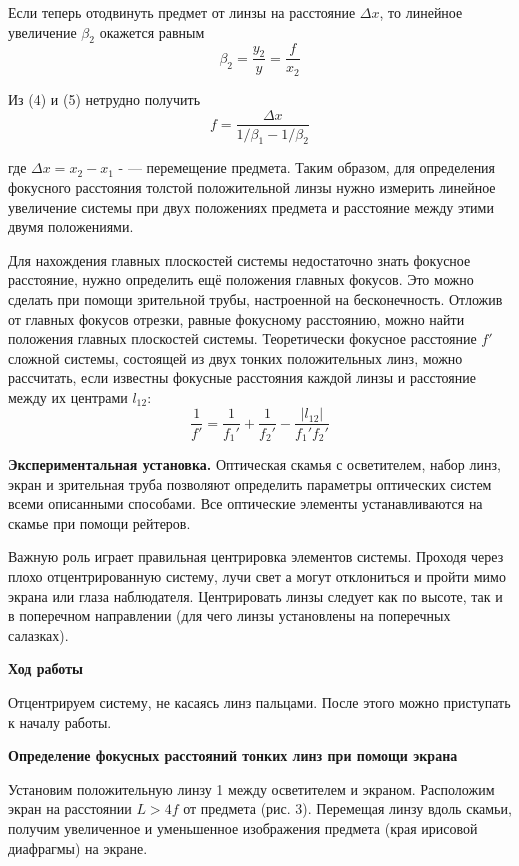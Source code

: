 \documentclass[14pt]{article}
\begin{document}
Если теперь отодвинуть предмет от линзы на расстояние $\Delta x$, то линейное
увеличение $\beta_2$ окажется равным
\begin{equation}
\beta_2 = \frac{y_2}{y} = \frac{f}{x_2}
\end{equation}

Из (4) и (5) нетрудно получить
\begin{equation}
f = \frac{\Delta x}{1/\beta_1 - 1/\beta_2}
\end{equation}

где $\Delta x = x_2 - x_1$ - — перемещение предмета.
Таким образом, для определения фокусного расстояния толстой положительной линзы нужно измерить
линейное увеличение системы при двух положениях предмета и
расстояние между этими двумя положениями.


Для нахождения главных плоскостей системы недостаточно знать
фокусное расстояние, нужно определить ещё положения главных фокусов.
Это можно сделать при помощи зрительной трубы, настроенной на бесконечность. Отложив от главных фокусов отрезки, равные фокусному
расстоянию, можно найти положения главных плоскостей системы.
Теоретически фокусное расстояние
$f'$ сложной системы, состоящей из
двух тонких положительных линз, можно рассчитать, если известны
фокусные расстояния
каждой линзы и расстояние между их центрами
$l_{12}$:
\begin{equation}
\frac{1}{f'} = \frac{1}{f_1'} + \frac{1}{f_2'} - \frac{|l_{12}|}{f_1'f_2'}
\end{equation}

\textbf{Экспериментальная
установка.} Оптическая скамья с осветителем,
набор линз, экран
и зрительная труба позволяют определить параметры
оптических систем всеми описанными способами. Все оптические элементы
устанавливаются на скамье при помощи рейтеров.

Важную роль играет правильная центрировка элементов системы.
Проходя через плохо отцентрированную систему, лучи свет
а могут отклониться
и пройти мимо экрана или глаза наблюдателя. Центрировать
линзы следует
как по высоте, так
и в поперечном направлении (для чего
линзы
установлены на поперечных салазках). 

\clearpage

\textbf{Ход работы}

Отцентрируем систему, не касаясь линз пальцами. После этого можно приступать к началу работы.

\textbf{Определение фокусных расстояний тонких линз при помощи экрана} 

Установим положительную линзу 1 между осветителем
и экраном.
Расположим экран на расстоянии
$L > 4f$ от предмета (рис. 3). Перемещая
линзу вдоль скамьи, получим увеличенное
и уменьшенное изображения предмета (края ирисовой диафрагмы) на экране.
\end{document}
